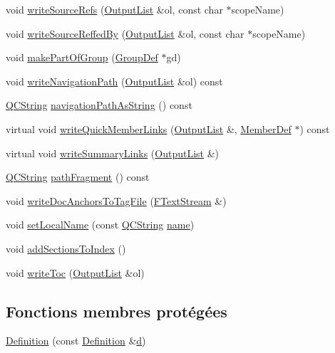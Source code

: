 \begin{DoxyCompactItemize}
\item 
void \hyperlink{class_definition_a0ec765eb2dc050ff415a76c5696db3dc}{write\+Source\+Refs} (\hyperlink{class_output_list}{Output\+List} \&ol, const char $\ast$scope\+Name)
\item 
void \hyperlink{class_definition_aa870f9f2ad5bfb0943d8718ace07bf63}{write\+Source\+Reffed\+By} (\hyperlink{class_output_list}{Output\+List} \&ol, const char $\ast$scope\+Name)
\item 
void \hyperlink{class_definition_aad0c6a6beb616a7f5530c0286b9d4bcc}{make\+Part\+Of\+Group} (\hyperlink{class_group_def}{Group\+Def} $\ast$gd)
\item 
void \hyperlink{class_definition_acb933b8a92878f6248e9a824c7115f24}{write\+Navigation\+Path} (\hyperlink{class_output_list}{Output\+List} \&ol) const 
\item 
\hyperlink{class_q_c_string}{Q\+C\+String} \hyperlink{class_definition_a92f5e4fd230d38f33163943f399085d4}{navigation\+Path\+As\+String} () const 
\item 
virtual void \hyperlink{class_definition_ad42890905d4583fe31ff65546ed55f7c}{write\+Quick\+Member\+Links} (\hyperlink{class_output_list}{Output\+List} \&, \hyperlink{class_member_def}{Member\+Def} $\ast$) const 
\item 
virtual void \hyperlink{class_definition_a2ea9c73788e47eeb9eed0c77725cb932}{write\+Summary\+Links} (\hyperlink{class_output_list}{Output\+List} \&)
\item 
\hyperlink{class_q_c_string}{Q\+C\+String} \hyperlink{class_definition_a3e43d0f37d4662880d0931c9150e5671}{path\+Fragment} () const 
\item 
void \hyperlink{class_definition_a30b5bc6680190c9d62c090f0627392d5}{write\+Doc\+Anchors\+To\+Tag\+File} (\hyperlink{class_f_text_stream}{F\+Text\+Stream} \&)
\item 
void \hyperlink{class_definition_ac20deb4c9dab79868fa8ec4f42ac84ff}{set\+Local\+Name} (const \hyperlink{class_q_c_string}{Q\+C\+String} \hyperlink{class_definition_a99481361779e85f0c1556709de7d9e5b}{name})
\item 
void \hyperlink{class_definition_af4b179bb64137b2e0b3da44b7b4d0f24}{add\+Sections\+To\+Index} ()
\item 
void \hyperlink{class_definition_ad831e89b81a88b3f4f298b9dce1dc549}{write\+Toc} (\hyperlink{class_output_list}{Output\+List} \&ol)
\end{DoxyCompactItemize}
\subsection*{Fonctions membres protégées}
\begin{DoxyCompactItemize}
\item 
\hyperlink{class_definition_a952d6c4a004165c823988111910e08cd}{Definition} (const \hyperlink{class_definition}{Definition} \&\hyperlink{060__command__switch_8tcl_af43f4b1f0064a33b2d662af9f06d3a00}{d})
\end{DoxyCompactItemize}
